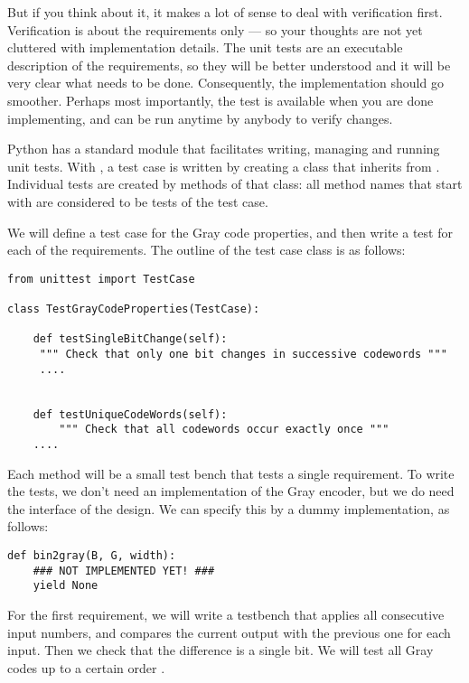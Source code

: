 But if you think about it, it makes a lot of sense to deal with
verification first. Verification is about the requirements only --- so
your thoughts are not yet cluttered with implementation details. The
unit tests are an executable description of the requirements, so they
will be better understood and it will be very clear what needs to be
done. Consequently, the implementation should go smoother. Perhaps
most importantly, the test is available when you are done
implementing, and can be run anytime by anybody to verify changes.

Python has a standard  module that facilitates writing,
managing and running unit tests. With , a test case is 
written by creating a class that inherits from
. Individual tests are created by methods of
that class: all method names that start with  are
considered to be tests of the test case.

We will define a test case for the Gray code properties, and then
write a test for each of the requirements. The outline of the test
case class is as follows:

\begin{verbatim}
from unittest import TestCase

class TestGrayCodeProperties(TestCase):

    def testSingleBitChange(self):
     """ Check that only one bit changes in successive codewords """
     ....


    def testUniqueCodeWords(self):
        """ Check that all codewords occur exactly once """
    ....

\end{verbatim}

Each method will be a small test bench that tests a single
requirement. To write the tests, we don't need an implementation of
the Gray encoder, but we do need the interface of the design. We can
specify this by a dummy implementation, as follows:

\begin{verbatim}
def bin2gray(B, G, width):
    ### NOT IMPLEMENTED YET! ###
    yield None

\end{verbatim}

For the first requirement, we will write a testbench that applies all
consecutive input numbers, and compares the current output with the
previous one for each input. Then we check that the difference is a
single bit. We will test all Gray codes up to a certain order
.

